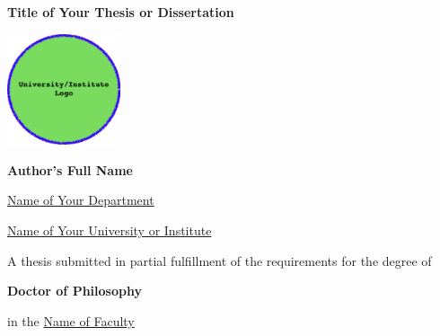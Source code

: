 \begin{titlepage}
    \centering
    {\LARGE \textbf{Title of Your Thesis or Dissertation} \par}
    \vspace{2cm}
    {\includegraphics[width=0.25\textwidth]{logo_sample.png} \par}
    \vspace{2cm}
    {\Large \textbf{Author's Full Name} \par}
    \vspace{0.5cm}
    {\Large \underline{Name of Your Department} \par}
    {\Large \underline{Name of Your University or Institute} \par}
    \vspace{1.5cm}
    {\Large A thesis submitted in partial fulfillment of the requirements for the degree of \par}
    {\Large \textbf{Doctor of Philosophy} \par}
    {\Large in the \underline{Name of Faculty} \par}  
    \vspace{3cm}
    {\Large \monthyeardate{\today} \par} %
\end{titlepage} 